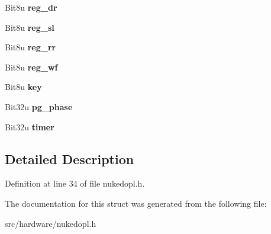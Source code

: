 \begin{DoxyCompactItemize}
\item 
\hypertarget{structopl3__slot_a9dc5bd76e66d2df7c31cb67e601242d8}{Bit8u {\bfseries reg\-\_\-dr}}\label{structopl3__slot_a9dc5bd76e66d2df7c31cb67e601242d8}

\item 
\hypertarget{structopl3__slot_a666c2dc9706218928ca8b445b9eddeac}{Bit8u {\bfseries reg\-\_\-sl}}\label{structopl3__slot_a666c2dc9706218928ca8b445b9eddeac}

\item 
\hypertarget{structopl3__slot_a314d42a1c89718e1f101f38a54c80fb4}{Bit8u {\bfseries reg\-\_\-rr}}\label{structopl3__slot_a314d42a1c89718e1f101f38a54c80fb4}

\item 
\hypertarget{structopl3__slot_afa7d2294b55c0aa91462e2b774f7596a}{Bit8u {\bfseries reg\-\_\-wf}}\label{structopl3__slot_afa7d2294b55c0aa91462e2b774f7596a}

\item 
\hypertarget{structopl3__slot_a62e303b80fbaacd8e1b3f3cb14f269c8}{Bit8u {\bfseries key}}\label{structopl3__slot_a62e303b80fbaacd8e1b3f3cb14f269c8}

\item 
\hypertarget{structopl3__slot_ac214c1dd3b5a8ff3efc180e067ef7758}{Bit32u {\bfseries pg\-\_\-phase}}\label{structopl3__slot_ac214c1dd3b5a8ff3efc180e067ef7758}

\item 
\hypertarget{structopl3__slot_a5ea90255fb079917d8bbb8bea8a9a3f0}{Bit32u {\bfseries timer}}\label{structopl3__slot_a5ea90255fb079917d8bbb8bea8a9a3f0}

\end{DoxyCompactItemize}


\subsection{Detailed Description}


Definition at line 34 of file nukedopl.\-h.



The documentation for this struct was generated from the following file\-:\begin{DoxyCompactItemize}
\item 
src/hardware/nukedopl.\-h\end{DoxyCompactItemize}
